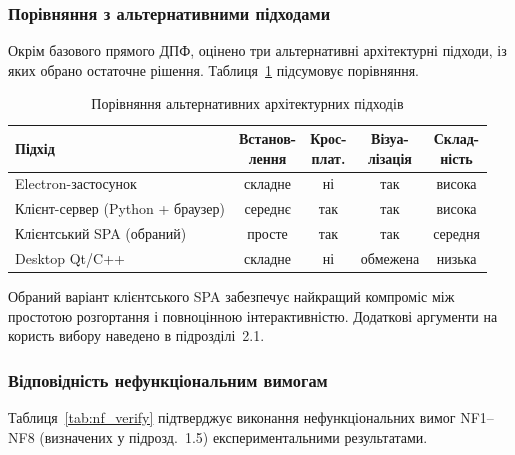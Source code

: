 \subsubsection*{Порівняння з альтернативними підходами}

Окрім базового прямого ДПФ, оцінено три альтернативні архітектурні
підходи, із яких обрано остаточне рішення. Таблиця~\ref{tab:alternatives}
підсумовує порівняння.

\begin{table}[H]
  \caption{Порівняння альтернативних архітектурних підходів}
  \label{tab:alternatives}
  \centering
  \begin{tabular}{p{4.0cm}cccc}
    \toprule
    Підхід & \makecell{Встанов-\\лення} & \makecell{Крос-\\плат.} & \makecell{Візуа-\\лізація} & \makecell{Склад-\\ність} \\
    \midrule
    Electron-застосунок               & складне & ні & так  & висока \\
    Клієнт-сервер (Python + браузер)  & середнє & так & так & висока \\
    Клієнтський SPA (обраний)          & просте  & так & так & середня \\
    Desktop Qt/C++                     & складне & ні & обмежена & низька \\
    \bottomrule
  \end{tabular}
\end{table}

Обраний варіант клієнтського SPA забезпечує найкращий компроміс між
простотою розгортання і повноцінною інтерактивністю. Додаткові
аргументи на користь вибору наведено в підрозділі~2.1.

\subsubsection*{Відповідність нефункціональним вимогам}

Таблиця~\ref{tab:nf_verify} підтверджує виконання нефункціональних
вимог NF1--NF8 (визначених у підрозд.~1.5) експериментальними
результатами.

